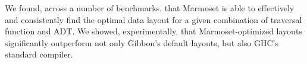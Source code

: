 \documentclass[acmsmall,review,anonymous]{acmart}\settopmatter{printfolios=true,printccs=false,printacmref=false}
\newcommand{\system}{{\sc Marmoset}\xspace}
\begin{document}
We found, across a number of benchmarks, that \system is able to effectively and consistently find the optimal data layout for a given combination of traversal function and ADT. We showed, experimentally, that \system-optimized layouts significantly outperform not only Gibbon's default layouts, but also GHC's standard compiler.
 
\end{document}
